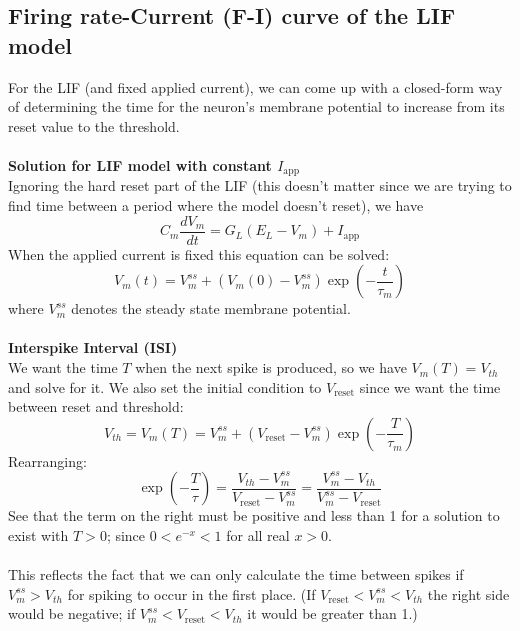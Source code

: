 \documentclass{report}
\begin{document}
\subsection{Firing rate-Current (F-I) curve of the LIF model}
For the LIF (and fixed applied current), we can come up with a closed-form way of determining the time for the neuron's 
membrane potential to increase from its reset value to the threshold.\\
\vspace{1mm}\\
\textbf{Solution for LIF model with constant $I_{\text{app}}$}\\
Ignoring the hard reset part of the LIF (this doesn't matter since we are trying to find time between a period where the model doesn't reset), we have
\begin{equation*}
C_m\frac{dV_m}{dt}=G_L(E_L-V_m)+I_\text{app}
\end{equation*}
When the applied current is fixed this equation can be solved:
\begin{equation*}
V_m(t)=V^{ss}_m+\left(V_m(0)-V^{ss}_m\right)\exp\left(-\frac{t}{\tau_m}\right)
\end{equation*}
where $V^{ss}_m$ denotes the steady state membrane potential.\\
\vspace{1mm}\\
\textbf{Interspike Interval (ISI)}\\
We want the time $T$ when the next spike is produced, so we have $V_m(T)=V_{th}$ and solve for it. We also set the initial condition to $V_{\text{reset}}$ since we
want the time between reset and threshold:
\begin{equation*}
V_{th}=V_m(T)=V^{ss}_m+\left(V_{\text{reset}}-V^{ss}_m\right)\exp\left(-\frac{T}{\tau_m}\right)
\end{equation*}
Rearranging:
\begin{equation*}
\exp\left(-\frac{T}{\tau}\right)=\frac{V_{th}-V^{ss}_m}{V_\text{reset}-V^{ss}_m}
=\frac{V^{ss}_m-V_{th}}{V^{ss}_m-V_\text{reset}}
\end{equation*}
See that the term on the right must be positive and less than 1 for a solution to exist with $T>0$; since $0<e^{-x}<1$ for all real $x>0$.\\
\vspace{1mm}\\
This reflects the fact that we can only calculate the time between spikes if $V^{ss}_m>V_{th}$ for spiking to occur in the first place.
(If $V_{\text{reset}}<V^{ss}_m<V_{th}$ the right side would be negative; if $V^{ss}_m<V_{\text{reset}}<V_{th}$ it would be greater than 1.)\\
\end{document}
